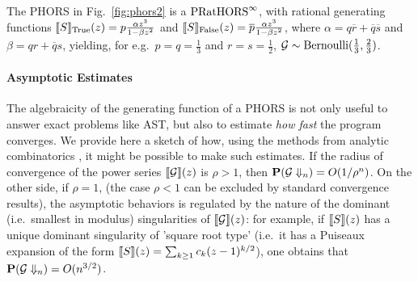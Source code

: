 \documentclass{easychair}
\begin{document}
 \begin{example}
The PHORS in Fig.~\ref{fig:phors2} is a $\text{PRatHORS}^{\infty}$, with rational generating functions 
$\llbracket S\rrbracket_{\mathrm{True}}(z)=p\frac{\alpha z^3}{1-\beta z^2}$ and $\llbracket S\rrbracket_{\mathrm{False}}(z)=\overline p\frac{\alpha z^3}{1-\beta z^2}$, where $\alpha=q\overline r+\overline q \overline s$ and $\beta=q r+\overline q s$, 
yielding, for e.g.~$p=q=\frac{1}{3}$ and $r=s=\frac{1}{2}$, $\mathcal{G}\sim\text{Bernoulli}(\frac{1}{3},\frac{2}{3})$.
\end{example}
 
 \paragraph{Asymptotic Estimates}
 The algebraicity of the generating function of a PHORS 
  is not only useful to answer exact problems like AST, but also to estimate \emph{how fast} the program converges. We provide here a sketch of how, using the methods from analytic combinatorics \cite{DBLP:books/daglib/0023751}, it might be possible to make such estimates. If the radius of convergence of the power series $\llbracket\mathcal{G}\rrbracket(z)$ is $\rho > 1$, then $\mathbf{P}(\mathcal{G}\Downarrow_n)= O(1/\rho^n)$. On the other side, if $\rho = 1$,
  (the case $\rho <1$ can be excluded by standard convergence results), 
   the asymptotic behaviors is regulated by the nature of the dominant (i.e.~smallest in modulus) singularities of $\llbracket\mathcal{G}\rrbracket(z)$: for example, if $\llbracket S\rrbracket(z)$ has a unique dominant singularity of 'square root type' (i.e.~it has a Puiseaux expansion of the form $\llbracket S\rrbracket(z)= \sum_{k \geq 1} c_k (z-1)^{k/2}$), one obtains that $\mathbf{P}({\mathcal{G}}\Downarrow_n)= O(n^{3/2})$.
   
\end{document}

